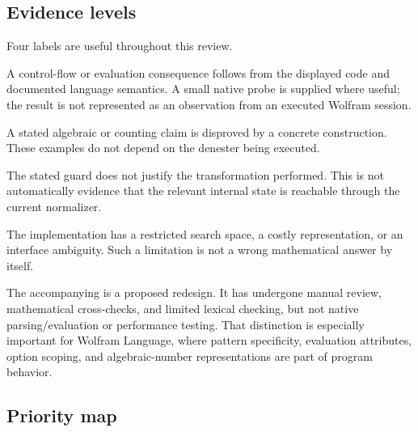 \documentclass[11pt,letterpaper]{article}
\newcommand{\code}[1]{\texttt{\detokenize{#1}}}
\theoremstyle{definition}
\theoremstyle{remark}
\begin{document}
\subsection{Evidence levels}

Four labels are useful throughout this review.

\begin{description}[style=nextline,leftmargin=1.5em]
\item[Source-level consequence.] A control-flow or evaluation consequence follows from the displayed code and documented language semantics. A small native probe is supplied where useful; the result is not represented as an observation from an executed Wolfram session.
\item[Exact mathematical counterexample.] A stated algebraic or counting claim is disproved by a concrete construction. These examples do not depend on the denester being executed.
\item[Proof gap.] The stated guard does not justify the transformation performed. This is not automatically evidence that the relevant internal state is reachable through the current normalizer.
\item[Engineering limitation.] The implementation has a restricted search space, a costly representation, or an interface ambiguity. Such a limitation is not a wrong mathematical answer by itself.
\end{description}

The accompanying \code{StradImproved.wl} is a proposed redesign. It has undergone manual review, mathematical cross-checks, and limited lexical checking, but not native parsing/evaluation or performance testing. That distinction is especially important for Wolfram Language, where pattern specificity, evaluation attributes, option scoping, and algebraic-number representations are part of program behavior.

\subsection{Priority map}
\end{document}
